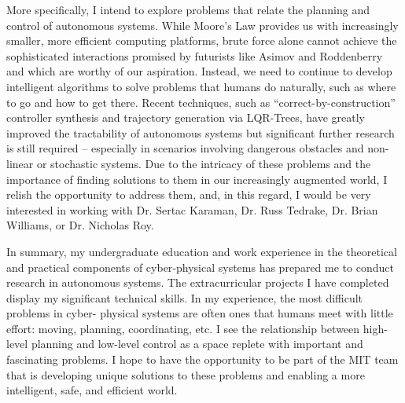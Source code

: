 \documentclass[]{letter}
\begin{document}
More specifically, I intend to explore problems that relate the planning and control of autonomous systems.  While Moore's Law provides us with increasingly smaller, more efficient computing platforms, brute force alone cannot achieve the sophisticated interactions promised by futurists like Asimov and Roddenberry and which are worthy of our aspiration.  Instead, we need to continue to develop intelligent algorithms to solve problems that humans do naturally, such as where to go and how to get there.  Recent techniques, such as “correct-by-construction” controller synthesis and trajectory generation via LQR-Trees, have greatly improved the tractability of autonomous systems but significant further research is still required -- especially in scenarios involving dangerous obstacles and non-linear or stochastic systems.  Due to the intricacy of these problems and the importance of finding solutions to them in our increasingly augmented world, I relish the opportunity to address them, and, in this regard, I would be very interested in working with Dr. Sertac Karaman, Dr. Russ Tedrake, Dr. Brian Williams, or Dr. Nicholas Roy.

In summary, my undergraduate education and work experience in the theoretical and practical components of cyber‑physical systems has prepared me to conduct research in autonomous systems. The extracurricular projects I have completed display my significant technical skills. In my experience, the most difficult problems in cyber- physical systems are often ones that humans meet with little effort: moving, planning, coordinating, etc. I see the relationship between high-level planning and low-level control as a space replete with important and fascinating problems. I hope to have the opportunity to be part of the MIT team that is developing unique solutions to these problems and enabling a more intelligent, safe, and efficient world.
\end{document}
